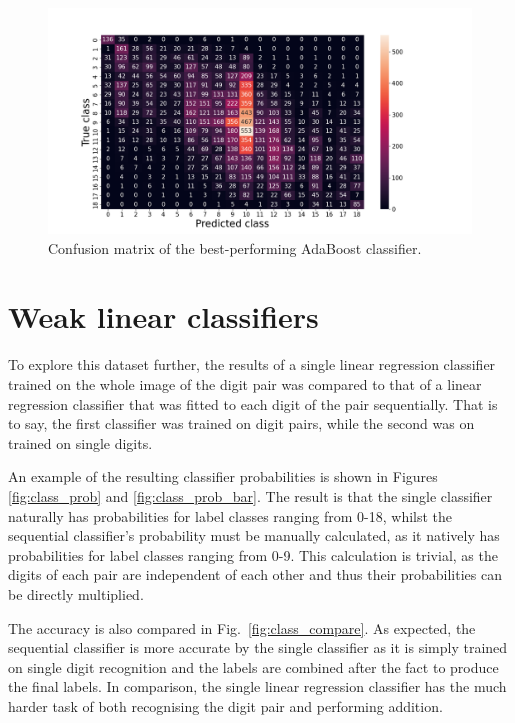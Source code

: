 \documentclass[11pt,a4paper]{article}
\begin{document}
\begin{figure}[htb]
    \centering
    \includegraphics[width=\columnwidth, keepaspectratio]{../confusion_AdaBoost Classifier.png}
    \caption{Confusion matrix of the best-performing AdaBoost classifier.}\label{fig:ab_confusion}
\end{figure}

\section{Weak linear classifiers}
To explore this dataset further, the results of a single linear regression classifier trained on the whole image of the digit pair was compared to that of a linear regression classifier that was fitted to each digit of the pair sequentially. That is to say, the first classifier was trained on digit pairs, while the second was on trained on single digits.

An example of the resulting classifier probabilities is shown in Figures \ref{fig:class_prob} and \ref{fig:class_prob_bar}. The result is that the single classifier naturally has probabilities for label classes ranging from 0-18, whilst the sequential classifier's probability must be manually calculated, as it natively has probabilities for label classes ranging from 0-9. This calculation is trivial, as the digits of each pair are independent of each other and thus their probabilities can be directly multiplied.

The accuracy is also compared in Fig.~\ref{fig:class_compare}. As expected, the sequential classifier is more accurate by the single classifier as it is simply trained on single digit recognition and the labels are combined after the fact to produce the final labels. In comparison, the single linear regression classifier has the much harder task of both recognising the digit pair and performing addition.
\end{document}
